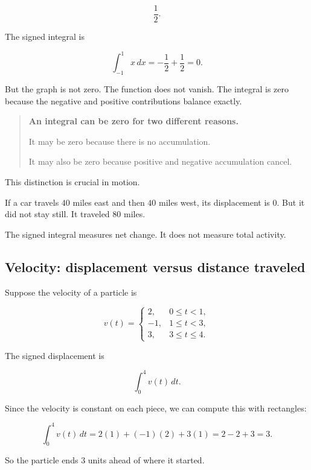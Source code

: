 \[
\frac12.
\]

The signed integral is

\[
\int_{-1}^{1} x\,dx
=
-\frac12+\frac12
=
0.
\]

But the graph is not zero.  The function does not vanish.  The integral is zero because the
negative and positive contributions balance exactly.

\begin{quote}
\textbf{An integral can be zero for two different reasons.}

It may be zero because there is no accumulation.

It may also be zero because positive and negative accumulation cancel.
\end{quote}

This distinction is crucial in motion.

If a car travels \(40\) miles east and then \(40\) miles west, its displacement is \(0\).  But
it did not stay still.  It traveled \(80\) miles.

The signed integral measures net change.  It does not measure total activity.

\subsection{Velocity: displacement versus distance traveled}
\label{subsec:velocity-displacement-distance-integrals}

Suppose the velocity of a particle is

\[
v(t)=
\begin{cases}
2, & 0\le t<1,\\
-1, & 1\le t<3,\\
3, & 3\le t\le4.
\end{cases}
\]

The signed displacement is

\[
\int_0^4 v(t)\,dt.
\]

Since the velocity is constant on each piece, we can compute this with rectangles:

\[
\int_0^4 v(t)\,dt
=
2(1)+(-1)(2)+3(1)
=
2-2+3
=
3.
\]

So the particle ends \(3\) units ahead of where it started.

